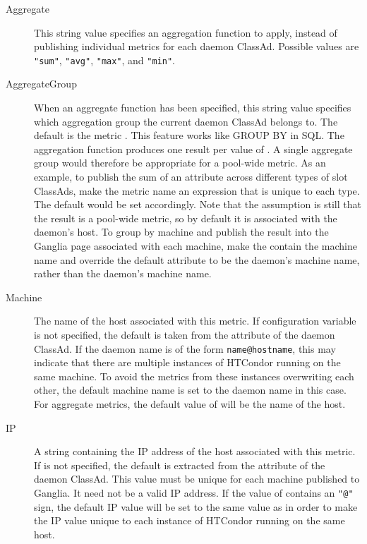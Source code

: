 \begin{description}
  \item[Aggregate] This string value specifies an aggregation function
    to apply, instead of publishing individual metrics for each daemon
    ClassAd.  Possible values are \verb|"sum"|, \verb|"avg"|, \verb|"max"|,
    and \verb|"min"|.

  \item[AggregateGroup] When an aggregate function has been specified,
    this string value specifies which aggregation group the current
    daemon ClassAd belongs to.  The default is the metric .  This
    feature works like GROUP BY in SQL.  The aggregation function
    produces one result per value of .  A single
    aggregate group would therefore be appropriate for a pool-wide
    metric.  
    As an example, 
    to publish the sum of an attribute across different types of slot
    ClassAds, make the metric name an expression that is unique
    to each type.  The default  would be set
    accordingly.  Note that the assumption is still that the result
    is a pool-wide metric, so by default it is associated with the
     daemon's host.
    To group by machine and publish the result into
    the Ganglia page associated with each machine, 
    make the  contain the machine name and override
    the default  attribute to be the daemon's machine
    name, rather than the  daemon's machine name.

  \item[Machine] The name of the host associated with this metric.  
    If configuration variable
     is not specified, 
    the default
    is taken from the  attribute of the daemon ClassAd.
    If the daemon name is of the form \verb|name@hostname|, this may
    indicate that there are multiple instances of HTCondor running on
    the same machine.  To avoid the metrics from these instances
    overwriting each other, the default machine name is set to the
    daemon name in this case.  For aggregate metrics, the default
    value of  will be the name of the  host.

  \item[IP] A string containing the IP address of the host associated
    with this metric.  If  is not
    specified, the default is extracted from the 
    attribute of the daemon ClassAd.  This value must be unique for each
    machine published to Ganglia.  It need not be a valid IP address.
    If the value of  contains an \verb|"@"| sign, the
    default IP value will be set to the same value as 
    in order to make the IP value unique to each instance of HTCondor
    running on the same host.

  \end{description}


